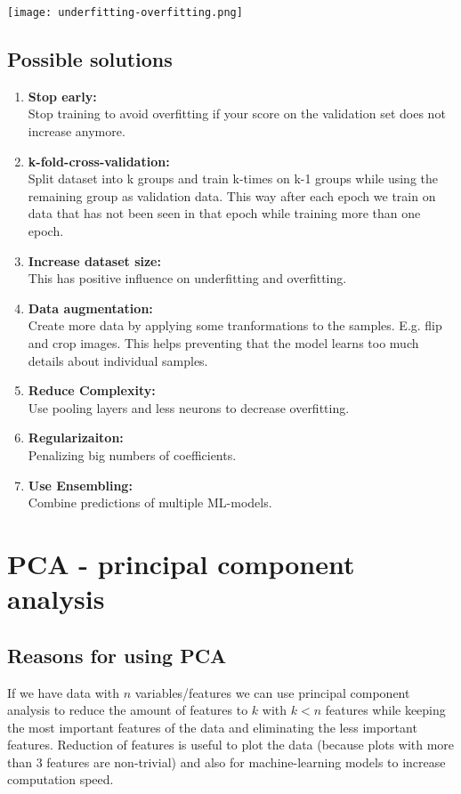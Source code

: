 \texttt{[image: underfitting-overfitting.png]}

\subsection{Possible solutions}

\begin{enumerate}
    \item \textbf{Stop early:}\\
          Stop training to avoid overfitting if your score on the validation set does not increase anymore.
    \item \textbf{k-fold-cross-validation:}\\
          Split dataset into k groups and train k-times on k-1 groups while using the remaining group as validation data. This way after each epoch we train on data that has not been seen in that epoch while training more than one epoch.
    \item \textbf{Increase dataset size:}\\
          This has positive influence on underfitting and overfitting.
    \item \textbf{Data augmentation:}\\
          Create more data by applying some tranformations to the samples. E.g. flip and crop images. This helps preventing that the model learns too much details about individual samples.
    \item \textbf{Reduce Complexity:}\\
          Use pooling layers and less neurons to decrease overfitting.
    \item \textbf{Regularizaiton:}\\
          Penalizing big numbers of coefficients.
    \item \textbf{Use Ensembling:}\\
          Combine predictions of multiple ML-models.
\end{enumerate}

\section{PCA - principal component analysis}

\subsection{Reasons for using PCA}

If we have data with $n$ variables/features we can use principal component analysis to reduce the amount of features to $k$ with $k < n$ features while keeping the most important features of the data and eliminating the less important features. Reduction of features is useful to plot the data (because plots with more than 3 features are non-trivial) and also for machine-learning models to increase computation speed.

